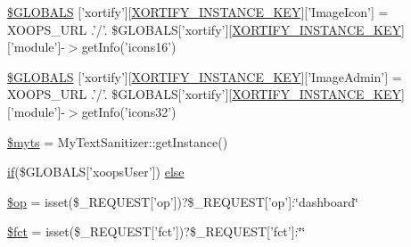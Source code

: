 \begin{DoxyCompactItemize}
\item 
\hyperlink{admin_2index_8php_a64b8ca00cce4671f7e9ca46aa82d0f88}{\$\-G\-L\-O\-B\-A\-L\-S} \mbox{[}'xortify'\mbox{]}\mbox{[}\hyperlink{instance_8php_ad4a865d4289ea8a5a0454b65e7ea47c7}{X\-O\-R\-T\-I\-F\-Y\-\_\-\-I\-N\-S\-T\-A\-N\-C\-E\-\_\-\-K\-E\-Y}\mbox{]}\mbox{[}'Image\-Icon'\mbox{]} = X\-O\-O\-P\-S\-\_\-\-U\-R\-L .'/'. \$G\-L\-O\-B\-A\-L\-S\mbox{[}'xortify'\mbox{]}\mbox{[}\hyperlink{instance_8php_ad4a865d4289ea8a5a0454b65e7ea47c7}{X\-O\-R\-T\-I\-F\-Y\-\_\-\-I\-N\-S\-T\-A\-N\-C\-E\-\_\-\-K\-E\-Y}\mbox{]}\mbox{[}'module'\mbox{]}-\/$>$get\-Info('icons16')
\item 
\hyperlink{admin_2index_8php_a337b648fca998b37a46d84b43aa6e8f9}{\$\-G\-L\-O\-B\-A\-L\-S} \mbox{[}'xortify'\mbox{]}\mbox{[}\hyperlink{instance_8php_ad4a865d4289ea8a5a0454b65e7ea47c7}{X\-O\-R\-T\-I\-F\-Y\-\_\-\-I\-N\-S\-T\-A\-N\-C\-E\-\_\-\-K\-E\-Y}\mbox{]}\mbox{[}'Image\-Admin'\mbox{]} = X\-O\-O\-P\-S\-\_\-\-U\-R\-L .'/'. \$G\-L\-O\-B\-A\-L\-S\mbox{[}'xortify'\mbox{]}\mbox{[}\hyperlink{instance_8php_ad4a865d4289ea8a5a0454b65e7ea47c7}{X\-O\-R\-T\-I\-F\-Y\-\_\-\-I\-N\-S\-T\-A\-N\-C\-E\-\_\-\-K\-E\-Y}\mbox{]}\mbox{[}'module'\mbox{]}-\/$>$get\-Info('icons32')
\item 
\hyperlink{admin_2index_8php_a12466d9a3f1c87076ded6bfe0cf0c9e5}{\$myts} = My\-Text\-Sanitizer\-::get\-Instance()
\item 
\hyperlink{poll_2index_8php_ae404acbb304be6b6ac443de921697faf}{if}(\$G\-L\-O\-B\-A\-L\-S\mbox{[}'xoops\-User'\mbox{]}) \hyperlink{admin_2index_8php_abeec3bb8da31e2d7ea01403e08a70401}{else}
\item 
\hyperlink{admin_2index_8php_a7c93a81c9b28ec2f78f33cdabda28c76}{\$op} = isset(\$\-\_\-\-R\-E\-Q\-U\-E\-S\-T\mbox{[}'op'\mbox{]})?\$\-\_\-\-R\-E\-Q\-U\-E\-S\-T\mbox{[}'op'\mbox{]}\-:\char`\"{}dashboard\char`\"{}
\item 
\hyperlink{admin_2index_8php_acc8d70c12faff4b8d057986eece72b6c}{\$fct} = isset(\$\-\_\-\-R\-E\-Q\-U\-E\-S\-T\mbox{[}'fct'\mbox{]})?\$\-\_\-\-R\-E\-Q\-U\-E\-S\-T\mbox{[}'fct'\mbox{]}\-:\char`\"{}\char`\"{}
\end{DoxyCompactItemize}


